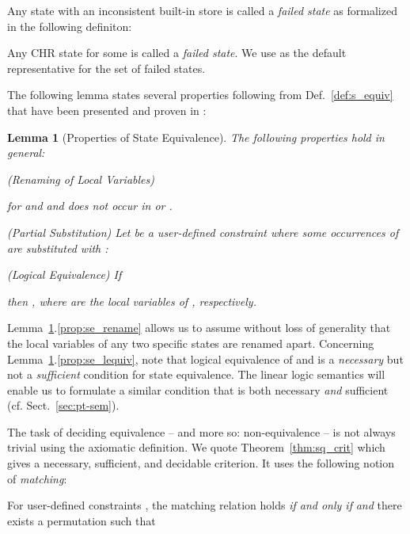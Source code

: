 \documentclass[acmtocl]{acmtrans2m}
\newtheorem{lemma}[theorem]{Lemma}
\begin{document}
Any state with an inconsistent built-in store is called a \emph{failed state} as
formalized in the following definiton:

\begin{definition}
Any CHR state  for some  is called a
\emph{failed state}. We use  as the default
representative for the set of failed states.
\end{definition}

The following lemma states several properties following from
Def.~\ref{def:s_equiv} that have been presented and proven in
:

\begin{lemma}[Properties of State Equivalence]
\label{lem:se_derived}
The following properties hold in general:
\begin{longenum}
\item \label{prop:se_rename} \emph{(Renaming of Local Variables)}

for  and  and  does not occur in  or .
\item \label{prop:se_partial} \emph{(Partial Substitution)} Let  be
a
user-defined constraint where \emph{some} occurrences of  are substituted with :

\item \label{prop:se_lequiv} \emph{(Logical Equivalence)} If

then ,  where  are the local variables of
, respectively.
\end{longenum}
\end{lemma}

Lemma~\ref{lem:se_derived}.\ref{prop:se_rename} allows us to assume without loss of generality that the local variables of any two specific states are renamed apart. Concerning Lemma~\ref{lem:se_derived}.\ref{prop:se_lequiv}, note that logical
equivalence of  and  is
a \emph{necessary} but not a \emph{sufficient} condition for state equivalence. The linear logic semantics will enable us to formulate a similar condition that is both necessary \emph{and} sufficient (cf. Sect.~\ref{sec:pt-sem}).

The task of deciding equivalence -- and more so: non-equivalence -- is not
always trivial using the axiomatic definition. We quote
Theorem~\ref{thm:sq_crit} which gives a necessary, sufficient, and decidable
criterion. It uses the following notion of \emph{matching}:

\begin{definition}
For user-defined constraints , the matching
relation  holds \emph{if and only if}  \emph{and} there exists a permutation 
such that

\end{definition}
\end{document}
